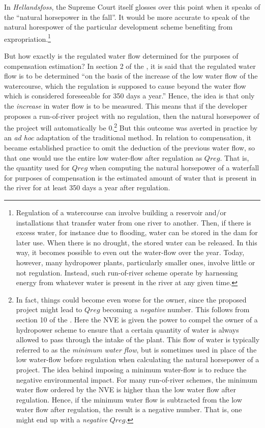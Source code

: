 In {\it Hellandsfoss}, the Supreme Court itself glosses over this point when it speaks of the ``natural horsepower in the fall''. It would be more accurate to speak of the natural horespower of the particular development scheme benefiting from expropriation.\footnote{Regulation of a watercourse can involve building a reservoir and/or installations that transfer water from one river to another. Then, if there is excess water, for instance due to flooding, water can be stored in the dam for later use. When there is no drought, the stored water can be released. In this way, it becomes possible to even out the water-flow over the year. Today, however, many hydropower plants, particularly smaller ones, involve little or not regulation. Instead, such run-of-river scheme operate by harnessing energy from whatever water is present in the river at any given time.}

But how exactly is the regulated water flow determined for the purposes of compensation estimation? In section 2 of the \cite{ica17}, it is said that the regulated water flow is to be determined ``on the basis of the increase of the low water flow of the watercourse, which the regulation is supposed to cause beyond the water flow which is considered foreseeable for 350 days a year.'' Hence, the idea is that only the {\it increase} in water flow is to be measured. This means that if the developer proposes a run-of-river project with no regulation, then the natural horsepower of the project will automatically be $0$.\footnote{In fact, things could become even worse for the owner, since the proposed project might lead to $Qreg$ becoming a {\it negative} number. This follows from section 10 of the \cite{wra00}. Here the NVE is given the power to compel the owner of a hydropower scheme to ensure that a certain quantity of water is always allowed to pass through the intake of the plant. This flow of water is typically referred to as the {\it minimum water flow}, but is sometimes used in place of the low water-flow before regulation when calculating the natural horsepower of a project. The idea behind imposing a minimum water-flow is to reduce the negative environmental impact. For many run-of-river schemes, the minimum water flow ordered by the NVE is higher than the low water flow after regulation. Hence, if the minimum water flow is subtracted from the low water flow after regulation, the result is a negative number. That is, one might end up with a {\it negative} $Qreg$.} But this outcome was averted in practice by an {\it ad hoc} adaptation of the traditional method. In relation to compensation, it became established practice to omit the deduction of the previous water flow, so that one would use the entire low water-flow after regulation as $Qreg$. That is, the quantity used for $Qreg$ when computing the natural horsepower of a waterfall for purposes of compensation is the estimated amount of water that is present in the river for at least 350 days a year after regulation.

